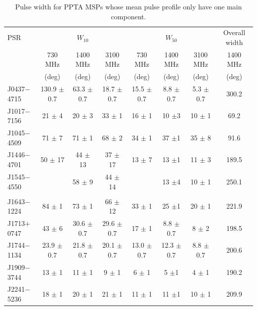 \documentclass[useAMS,usenatbib]{mn2e}
\begin{document}
\begin{table}
\begin{center}
\caption{Pulse width for PPTA MSPs whose mean pulse profile only have one 
main component.}
\label{tableWidth}
\begin{tabular}{lccccccc}
\hline
PSR              &         & $W_{10}$ &          &         & $W_{50}$ &          &  Overall width   \\
								 & 730 MHz & 1400 MHz & 3100 MHz & 730 MHz & 1400 MHz & 3100 MHz &  1400 MHz        \\
								 & (deg)   & (deg)    &  (deg)   &  (deg)  & (deg)    &   (deg)  &   (deg)          \\
\hline                                                                               
J0437$-$4715     &  130.9 $\pm$ 0.7  & 63.3 $\pm$ 0.7   & 18.7 $\pm$ 0.7   & 15.5 $\pm$ 0.7 & 8.8 $\pm $0.7 & 5.3 $\pm$ 0.7 &  300.2           \\ 
J1017$-$7156     &     21 $\pm$ 4    &   20 $\pm$ 3     &   33 $\pm$ 1     &   16 $\pm$ 1   &  10 $\pm $3   &  10 $\pm$ 1   &  69.2            \\ 
J1045$-$4509     &     71 $\pm$ 7    &   71 $\pm$ 1     &   68 $\pm$ 2     &   34 $\pm$ 1   &  37 $\pm $1   &  35 $\pm$ 8   &  91.6            \\ 
J1446$-$4701     &     50 $\pm$ 17   &   44 $\pm$ 13    &   37 $\pm$ 17    &   13 $\pm$ 7   &  13 $\pm $1   &  11 $\pm$ 3   &  189.5           \\ 
J1545$-$4550     &                   &   58 $\pm$ 9     &   44 $\pm$ 14    &                &  13 $\pm $4   &  10 $\pm$ 1   &  250.1           \\ 
	               &                   &                  &                  &                &               &               &                  \\   
J1643$-$1224     &     84 $\pm$ 1    &   73 $\pm$ 1     &   66 $\pm$ 12    &   33 $\pm$ 1   &  25 $\pm $1   &  20 $\pm$ 1   &  221.9           \\ 
J1713$+$0747     &     43 $\pm$ 6    & 30.6 $\pm$ 0.7   & 29.6 $\pm$ 0.7   &   17 $\pm$ 1   & 8.8 $\pm $0.7 &   8 $\pm$ 2   &  198.5           \\ 
J1744$-$1134     &   23.9 $\pm$ 0.7  & 21.8 $\pm$ 0.7   & 20.1 $\pm$ 0.7   & 13.0 $\pm$ 0.7 &12.3 $\pm $0.7 & 8.8 $\pm$ 0.7 &  200.6           \\ 
J1909$-$3744     &     13 $\pm$ 1    &   11 $\pm$ 1     &    9 $\pm$ 1     &    6 $\pm$ 1   &   5 $\pm $1   &   4 $\pm$ 1   &  190.2           \\ 
J2241$-$5236     &     18 $\pm$ 1    &   20 $\pm$ 1     &   21 $\pm$ 1     &   11 $\pm$ 1   &  11 $\pm $1   &  10 $\pm$ 1   &  209.9           \\ 
\hline
\end{tabular}
\end{center}
\end{table}
\end{document}
